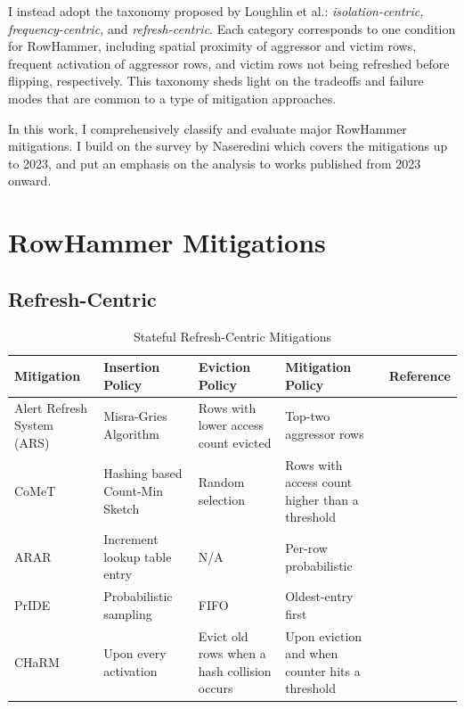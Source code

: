 \documentclass[journal,twocolumn]{IEEEtran}
\begin{document}
	I instead adopt the taxonomy proposed by Loughlin et al.\cite{Loughlin21}: \textit{isolation-centric, frequency-centric,} and \textit{refresh-centric}. Each category corresponds to one condition for RowHammer, including spatial proximity of aggressor and victim rows, frequent activation of aggressor rows, and victim rows not being refreshed before flipping, respectively. This taxonomy sheds light on the tradeoffs and failure modes that are common to a type of mitigation approaches. 
	
	In this work, I comprehensively classify and evaluate major RowHammer mitigations. I build on the survey by Naseredini\cite{Naseredini23} which covers the mitigations up to 2023, and put an emphasis on the analysis to works published from 2023 onward.
	
	\section{RowHammer Mitigations}
	
	\subsection{Refresh-Centric}
	
	\begin{table}
		\centering
		\caption{Stateful Refresh-Centric Mitigations}\label{tab:refreshcomp}
		\def\arraystretch{1.1}
		\begin{tabular}{p{}p{}p{}p{}c}
			\toprule
			Mitigation & Insertion Policy & Eviction Policy & Mitigation Policy & Reference \\
			\midrule
			Alert Refresh System (ARS) & Misra-Gries Algorithm & Rows with lower access count evicted & Top-two aggressor rows & \cite{Kim23}
			\\
			CoMeT & Hashing based Count-Min Sketch & Random selection & Rows with access count higher than a threshold & \cite{Bostanci24}
			\\
			ARAR & Increment lookup table entry & N/A & Per-row probabilistic & \cite{Demirseren24}
			\\
			PrIDE & Probabilistic sampling & FIFO & Oldest-entry first 
			& \cite{Jaleel24}
			\\
			CHaRM & Upon every activation & Evict old rows when a hash collision occurs & Upon eviction and when counter hits a threshold & \cite{Nazaraliyev25}
			\\ 
			\bottomrule
		\end{tabular}
	\end{table}
	
\end{document}
